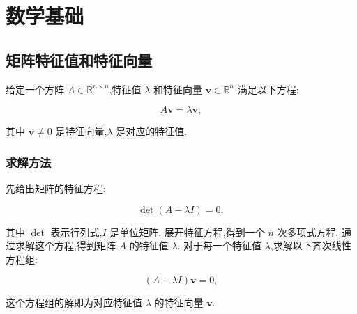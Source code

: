\chapter{数学基础}\label{chap:background}
\section{矩阵特征值和特征向量}
\begin{defn}[特征值和特征向量]\cite{treil2016linear}
    给定一个方阵 \( A \in \mathbb{R}^{n \times n} \),特征值 \( \lambda \) 和特征向量 \( \mathbf{v} \in \mathbb{R}^n \) 满足以下方程:

\[
A \mathbf{v} = \lambda \mathbf{v},
\]

其中 \( \mathbf{v} \neq 0 \) 是特征向量,\( \lambda \) 是对应的特征值. 
\end{defn}


\subsection*{求解方法}

先给出矩阵的特征方程:

    \[
    \det(A - \lambda I) = 0,
    \]

其中 \( \det \) 表示行列式,\( I \) 是单位矩阵. 展开特征方程,得到一个 \( n \) 次多项式方程. 通过求解这个方程,得到矩阵 \( A \) 的特征值 \( \lambda \).  对于每一个特征值 \( \lambda \),求解以下齐次线性方程组:

    \[
    (A - \lambda I) \mathbf{v} = 0,
    \]

这个方程组的解即为对应特征值 \( \lambda \) 的特征向量 \( \mathbf{v} \). 

